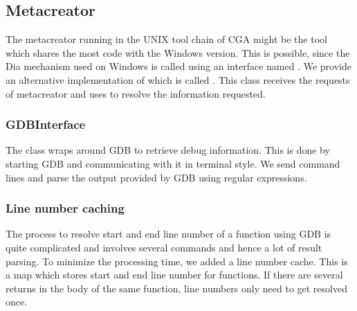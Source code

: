 \subsection{Metacreator} The metacreator running in the UNIX tool chain of CGA might be the tool which shares the most code with the Windows version. This is possible, since the Dia mechanism used on Windows is called using an interface named . We provide an alternative implementation of  which is called . This class receives the requests of metacreator and uses  to resolve the information requested.

\subsubsection{GDBInterface} The  class wraps around GDB to retrieve debug information. This is done by starting GDB and communicating with it in terminal style. We send command lines and parse the output provided by GDB using regular expressions. 

\subsubsection{Line number caching} The process to resolve start and end line number of a function using GDB is quite complicated and involves several commands and hence a lot of result parsing. To minimize the processing time, we added a line number cache. This is a map which stores start and end line number for functions. If there are several returns in the body of the same function, line numbers only need to get resolved once.
